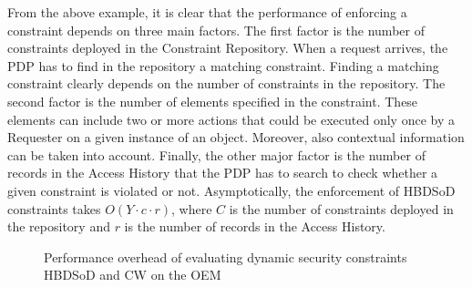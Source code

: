 \documentclass[epsfig,a4paper,11pt,titlepage]{book}
\numberwithin{algorithm}{chapter}
\begin{document}
From the above example, it is clear that the performance of enforcing a constraint depends on three main factors. The first factor is the number of constraints deployed in the Constraint Repository. When a request arrives, the \gls{PDP} has to find in the repository a matching constraint. Finding a matching constraint clearly depends on the number of constraints in the repository. The second factor is the number of elements specified in the constraint. These elements can include two or more actions that could be executed only once by a Requester on a given instance of an object. Moreover, also contextual information can be taken into account. Finally, the other major factor is the number of records in the Access History that the \gls{PDP} has to search to check whether a given constraint is violated or not. Asymptotically, the enforcement of \gls{HBDSoD} constraints takes $O(Y \cdot c \cdot r)$, where $C$ is the number of constraints deployed in the repository and $r$ is the number of records in the Access History.


\begin{figure}[htp]
\centering
{}
\caption[Performance overhead of evaluating dynamic security constraints]{Performance overhead of evaluating dynamic security constraints  \gls{HBDSoD} and  \gls{CW} on the \gls{OEM}}
\label{fig:egrant-constraint-evaluation}
\end{figure}
\end{document}
